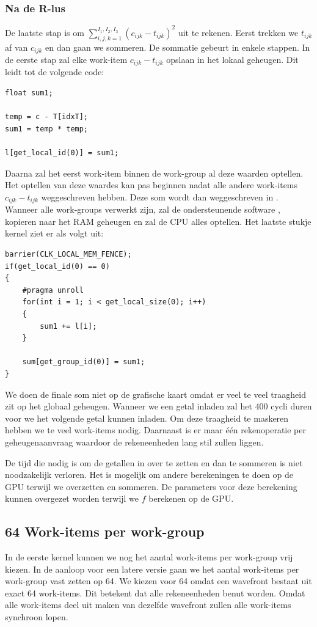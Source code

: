 \subsubsection{Na de R-lus}
De laatste stap is om $\sum_{i,j,k = 1}^{I_1, I_2, I_3} \left(c_{ijk} - t_{ijk}\right)^2$ uit te rekenen. Eerst trekken we $t_{ijk}$ af van $c_{ijk}$ en dan gaan we sommeren. De sommatie gebeurt in enkele stappen. In de eerste stap zal elke work-item $c_{ijk} - t_{ijk}$ opslaan in het lokaal geheugen. Dit leidt tot de volgende code:
\begin{lstlisting}
float sum1;

temp = c - T[idxT];
sum1 = temp * temp;

l[get_local_id(0)] = sum1;
\end{lstlisting}

Daarna zal het eerst work-item binnen de work-group al deze waarden optellen. Het optellen van deze waardes kan pas beginnen nadat alle andere work-items $c_{ijk} - t_{ijk}$ weggeschreven hebben. Deze som wordt dan weggeschreven in . Wanneer alle work-groups verwerkt zijn, zal de ondersteunende software ,  kopieren naar het RAM geheugen en zal de CPU alles optellen. Het laatste stukje kernel ziet er als volgt uit:
\begin{lstlisting}
barrier(CLK_LOCAL_MEM_FENCE);
if(get_local_id(0) == 0)
{        
    #pragma unroll
    for(int i = 1; i < get_local_size(0); i++)
    {
        sum1 += l[i];
    }
    
    sum[get_group_id(0)] = sum1;
}
\end{lstlisting}

We doen de finale som niet op de grafische kaart omdat er veel te veel traagheid zit op het globaal geheugen. Wanneer we een getal inladen zal het 400 cycli duren voor we het volgende getal kunnen inladen. Om deze traagheid te maskeren hebben we te veel work-items nodig. Daarnaast is er maar \'e\'en rekenoperatie per geheugenaanvraag waardoor de rekeneenheden lang stil zullen liggen. 

De tijd die nodig is om de getallen in  over te zetten en dan te sommeren is niet noodzakelijk verloren. Het is mogelijk om andere berekeningen te doen op de GPU terwijl we  overzetten en sommeren. De parameters voor deze berekening kunnen overgezet worden terwijl we $f$  berekenen op de GPU.

\subsection{64 Work-items per work-group}
In de eerste kernel kunnen we nog het aantal work-items per work-group vrij kiezen. In de aanloop voor een latere versie gaan we het aantal work-items per work-group vast zetten op 64. We kiezen voor 64 omdat een wavefront bestaat uit exact 64 work-items. Dit betekent dat alle rekeneenheden benut worden. Omdat alle work-items deel uit maken van dezelfde wavefront zullen alle work-items synchroon lopen.

